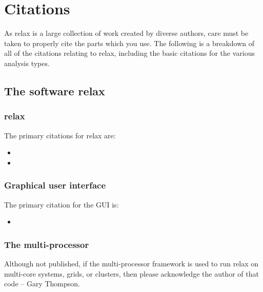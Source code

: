 
\chapter{Citations} \label{ch: citations}

As relax is a large collection of work created by diverse authors, care must be taken to properly cite the parts which you use.  The following is a breakdown of all of the citations relating to relax, including the basic citations for the various analysis types.




\section{The software relax}



\subsection{relax}

The primary citations for relax are:

\begin{itemize}
\item {}
\item {}
\end{itemize}



\subsection{Graphical user interface}

The primary citation for the GUI is:

\begin{itemize}
\item {}
\end{itemize}



\subsection{The multi-processor}

Although not published, if the multi-processor framework is used to run relax on multi-core systems, grids, or clusters, then please acknowledge the author of that code -- Gary Thompson.



